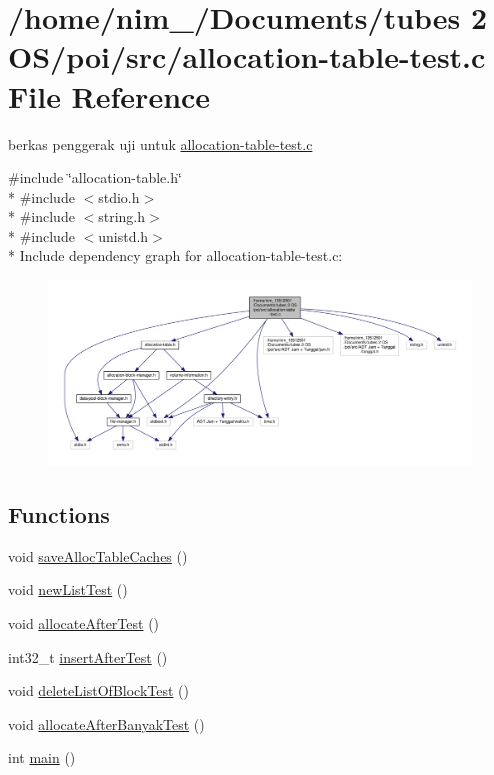 \hypertarget{allocation-table-test_8c}{\section{/home/nim\-\_/\-Documents/tubes 2 O\-S/poi/src/allocation-\/table-\/test.c File Reference}
\label{allocation-table-test_8c}
}


berkas penggerak uji untuk \hyperlink{allocation-table-test_8c}{allocation-\/table-\/test.\-c}  


{\ttfamily \#include \char`\"{}allocation-\/table.\-h\char`\"{}}\\*
{\ttfamily \#include $<$stdio.\-h$>$}\\*
{\ttfamily \#include $<$string.\-h$>$}\\*
{\ttfamily \#include $<$unistd.\-h$>$}\\*
Include dependency graph for allocation-\/table-\/test.c\-:\nopagebreak
\begin{figure}[H]
\begin{center}
\leavevmode
\includegraphics[width=350pt]{allocation-table-test_8c__incl}
\end{center}
\end{figure}
\subsection*{Functions}
\begin{DoxyCompactItemize}
\item 
void \hyperlink{allocation-table-test_8c_a20af25d3b441d1f25e4830ee2173480c}{save\-Alloc\-Table\-Caches} ()
\item 
void \hyperlink{allocation-table-test_8c_ae0bde2314239fb8dbf38c13fee0a68fe}{new\-List\-Test} ()
\item 
void \hyperlink{allocation-table-test_8c_a57b7cb9823d22ea55528c91e219b7dae}{allocate\-After\-Test} ()
\item 
int32\-\_\-t \hyperlink{allocation-table-test_8c_ae8700eb5d460019b20c7bdf4d0b5880b}{insert\-After\-Test} ()
\item 
void \hyperlink{allocation-table-test_8c_ace8f7db6e87db1e1e06efbc9437e58f1}{delete\-List\-Of\-Block\-Test} ()
\item 
void \hyperlink{allocation-table-test_8c_a9126bcf052408b8d8f30110d1a6c7627}{allocate\-After\-Banyak\-Test} ()
\item 
int \hyperlink{allocation-table-test_8c_ae66f6b31b5ad750f1fe042a706a4e3d4}{main} ()
\end{DoxyCompactItemize}
